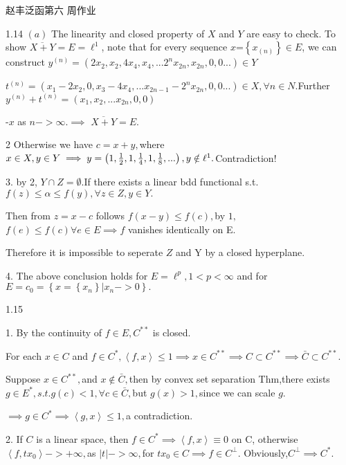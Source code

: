 \documentclass{article}
\begin{document}
赵丰\qquad 泛函第六%
周作业

1.14 $\left( a\right) $ The linearity and closed property of $X$ and $Y$ are
easy to check. To show $\overline{X+Y}=E=\ell ^{1}$, note that for every
sequence $x$=$\left\{ x_{\left( n\right) }\right\} \in E$, we can construct $%
y^{\left( n\right) }=\left(
2x_{2},x_{2},4x_{4},x_{4},...2^{n}x_{2n},x_{2n},0,0...\right) \in Y$

$t^{\left( n\right) }=\left(
x_{1}-2x_{2},0,x_{3}-4x_{4},...x_{2n-1}-2^{n}x_{2n},0,0...\right) \in
X,\forall n\in N.$Further $y^{\left( n\right) }+t^{\left( n\right) }=\left(
x_{1},x_{2},...x_{2n},0,0\right) $

-\TEXTsymbol{>}$x$ as $n->\infty .\implies $ $\overline{X+Y}=E.$

2 Otherwise we have $c=x+y,$where $x\in X,y\in Y\implies y=\left( 1,\frac{1}{%
2},1,\frac{1}{4},1,\frac{1}{8},...\right) ,y\notin \ell ^{1}.$Contradiction!

3. by 2, $Y\cap Z=\emptyset .$If there exists a linear bdd functional s.t. $%
f\left( z\right) \leq \alpha \leq f\left( y\right) ,\forall z\in Z,y\in Y.$

Then from $z=x-c$ follows $f\left( x-y\right) \leq f\left( c\right) ,$by $1,$
$f\left( e\right) \leq f\left( c\right) \forall e\in E\implies f$ vanishes
identically on E.

Therefore it is impossible to seperate $Z$ and Y by a closed hyperplane.

4. The above conclusion holds for $E=\ell ^{p},1<p<\infty $ and for $%
E=c_{0}=\left\{ x=\left\{ x_{n}\right\} |x_{n}->0\right\} .$

1.15

1. By the continuity of $f\in E,C^{\ast \ast }$ is closed.

For each $x\in C$ and $f\in C^{\ast },\left\langle f,x\right\rangle \leq
1\implies x\in C^{\ast \ast }\implies C\subset C^{\ast \ast }\implies \bar{C}%
\subset C^{\ast \ast }.$

Suppose $x\in C^{\ast \ast },$and $x\notin \bar{C},$then by convex set
separation Thm,there exists $g\in E^{\ast },s.t.g\left( c\right) <1,\forall
c\in \bar{C},$but $g\left( x\right) >1,$since we can scale $g.$

$\implies g\in C^{\ast }\implies \left\langle g,x\right\rangle \leq 1,$a
contradiction.

2. If $C$ is a linear space, then $f\in C^{\ast }\implies \left\langle
f,x\right\rangle \equiv 0$ on C, otherwise $\left\langle
f,tx_{0}\right\rangle ->+\infty ,$as $\left\vert t\right\vert ->\infty ,$for 
$tx_{0}\in C\implies f\in C^{\bot }.$ Obviously,$C^{\bot }\implies C^{\ast
}. $
\end{document}
